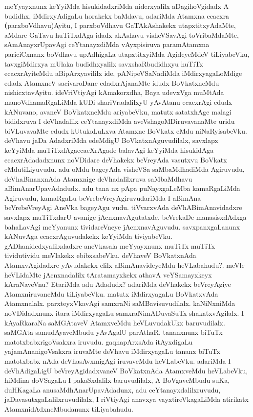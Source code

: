 \begin{artha}
meYyayxnunx keYyiMda hisukidadxriMda niderxyalilx aDagihoVgidadx A
budidhx, iMdirxyAdigaLu horakekx baMdavu, adariMda Atamxna ecacxra
\textbf(parxboVdhavu)Ayitu, I parxboVdhavu GaTAkAshakekx
utapxtitxyAdaMte, aMdare GaTavu huTiTxdAga idadx akAshavu visheVSavAgi
toVribaMdaMte, sAmAnayxrUpavAgi ceYtanayxdiMda vAyxpisiruva
paramAtamxna pariciCxnanx boVdhavu upAdhigaLa utapxtitxyiMda
AgideyeMdeV tiLiyabeVku,  tavxgiMdirxya mUlaka budidhxyalilx
savxshaRbudidhxyu huTiTx ecacxrAyiteMdu aBipArxyavililx ide, pANipeVSaNadiMda iMdirxyagaLoMdige edadx AtamxneV sacivaroDane
edadxrAjanaMte idudx BoVkatxneMdu nishicxtavAyitu. ideVriVtiyAgi
kAmakorxdha, Baya udevxVga muMtAda manoVdhamaRgaLiMda kUDi
shariVradalilxyU yAvAtanu ecacxrAgi edudx kANuvano, avaneV BoVkatxneMdu
ariyabeVku, matutx satatxhAge malagi bididxruva I deVhadalilx
ceYtanayxdiMda aveVshagoMDiruvavanaMte uridu biVLuvavaMte
edudx kUtukoLuLxva Atamxne BoVkatx eMdu niNaRyisabeVku. deVhavu
jaDa AdadxriMda edeMdigU BoVkatxnAguvudilalx, savxlapx keYyiMda
muTiTxdAga\break ecacXrAgade balavAgi keYyiMda hisukidAga ecacxrAdadadxnunx
noVDidare deVhakekx beVreyAda vasutxvu BoVkatx eMdutiLiyuvudu. adu
oMdu bageyAda visheVSa saMbaMdhadiMda Agiruvudu, deVhaBinanxnAda
Atamxnige deVhadalilxruva saMbaMdhavu aBimAnarUpavAdadudx. adu tana
nx pApa puNayxgaLeMba kamaRgaLiMda Agiruvudu, kamaRgaLu
beVrebeVreyAgiruvudariMda I aBimAna beVrebeVreyAgi AneVka
bageyAgu vudu. tiVvarxvAda deVhABimAnavidadxre savxlapx muTiTxdarU avanige
jAcnxnavAgutatxde. beVrekaDe manasisxdAdxga bahaLavAgi meYyanunx
tividareVneye jAcnxnavAguvudu. savxpanxgaLanunx kANuvAga
ecacxrAguvudakekx keYyiMda tiviyabeVku. gADhanidedxyalilxdadxre
aneVkasala meYyayxnunx muTiTx muTiTx tividutividu meVlakekx
ebibxsabeVku. deVhaveV BoVkatxnAda AtamxvAgidadxre yAvudakekx elilx
aBimAnavideyeMdu heVLabahudu?. meVle heVLidaMte jAcnxnadalilx
tAratamayxkekx athavA veYSamayxkeyx kAraNaveVnu? EtariMda adu Adadudx? adariMda deVhakekx beVreyAgiye AtamxniruvaneMdu tiLiyabeVku. matutx
iMdirxyagaLu BoVkatxvAda Atamxnalalx. parxteyxVkavAgi samxraNi
saMBavisuvudilalx. kaNiNxniMda noVDidadxnunx itara\break
iMdirxyagaLu samxraNimADuvaSuTx shakatxvAgilalx. I kAyaRkaraNa
saMGAtaveV AtamxveMdu heVLuvudakUkx baruvudilalx. saMGAta
samudAyaveMbudu yAvAgalU parAthaR, tananxnunx biTuTx
matotxbabxrigoVsakxra iruvudu. gaqhapArxsAda itAyxdigaLu
yajamAnanigoVsakxra iruvaMte deVhavu iMdirxyagaLu tananx biTuTx
matotxbabx nAda deVhasAvxmigAgi iruvaveMdu heVLabeVku. adariMda I
deVhAdigaLigU beVreyAgidadxvaneV BoVkatxnAda AtamxveMdu heVLabeVku,
hiMdina doVSagaLu I pakaSxdalilx baruvudilalx, A BoVgaveMbudu suKa,
duHKagaLa anusaMdhAnarUpavAdadunx, adu ceYtanayxdalilxruvudu,
jaDavasutxgaLalilxruvudilalx, I riVtiyAgi anavxya vayxtireVkagaLiMda
atirikatx AtamxnidAdxneMbudanunx tiLiyabahudu.
\end{artha}

